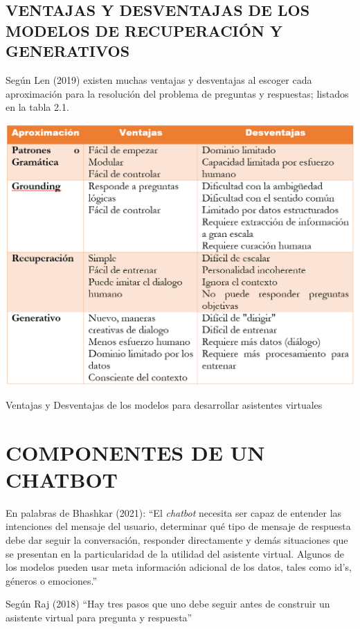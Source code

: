 \documentclass[letter, openright, 12pt]{book}
\begin{document}
\subsection{VENTAJAS Y DESVENTAJAS DE LOS MODELOS DE RECUPERACIÓN Y GENERATIVOS}

Según Len (2019) existen muchas ventajas y desventajas al escoger cada aproximación para la resolución del problema de preguntas y respuestas; listados en la tabla 2.1.

\begin{table}[!ht]
\includegraphics[width=1\textwidth]{tabla2_1}
\caption{Ventajas y Desventajas de los modelos para desarrollar asistentes virtuales}
\label{tab:tabla2_1} 
\end{table}

\section{COMPONENTES DE UN CHATBOT}
En palabras de Bhashkar (2021): “El \textit{chatbot} necesita ser capaz de entender las intenciones del mensaje del usuario, determinar qué tipo de mensaje de respuesta debe dar seguir la conversación, responder directamente y demás situaciones que se presentan en la particularidad de la utilidad del asistente virtual. Algunos de los modelos pueden usar meta información adicional de los datos, tales como id’s, géneros o emociones.”
\par
Según Raj (2018) “Hay tres pasos que uno debe seguir antes de construir un asistente virtual para pregunta y respuesta” 
\end{document}
